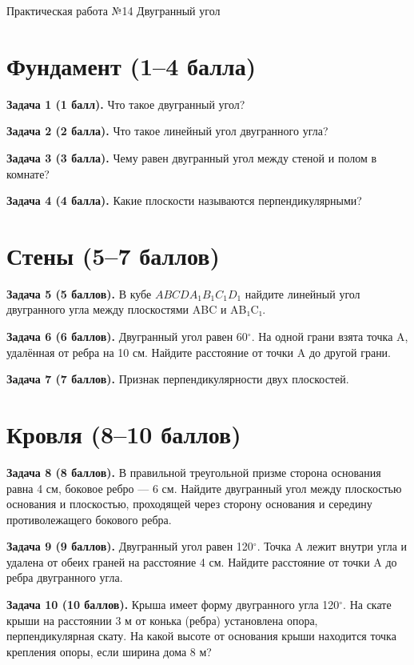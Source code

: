 \documentclass{umk-matematika}
\begin{document}
\maketitlepage
    {Практическая работа №14}
    {Двугранный угол}
    {}

\section{Фундамент (1--4 балла)}

\textbf{Задача 1 (1 балл).} Что такое двугранный угол?

\textbf{Задача 2 (2 балла).} Что такое линейный угол двугранного угла?

\textbf{Задача 3 (3 балла).} Чему равен двугранный угол между стеной и полом в комнате?

\textbf{Задача 4 (4 балла).} Какие плоскости называются перпендикулярными?

\section{Стены (5--7 баллов)}

\textbf{Задача 5 (5 баллов).} В кубе $ABCDA_1B_1C_1D_1$ найдите линейный угол двугранного угла между плоскостями ABC и AB₁C₁.

\textbf{Задача 6 (6 баллов).} Двугранный угол равен 60$^\circ$. На одной грани взята точка A, удалённая от ребра на 10 см. Найдите расстояние от точки A до другой грани.

\textbf{Задача 7 (7 баллов).} Признак перпендикулярности двух плоскостей.

\section{Кровля (8--10 баллов)}

\textbf{Задача 8 (8 баллов).} В правильной треугольной призме сторона основания равна 4 см, боковое ребро — 6 см. Найдите двугранный угол между плоскостью основания и плоскостью, проходящей через сторону основания и середину противолежащего бокового ребра.

\textbf{Задача 9 (9 баллов).} Двугранный угол равен 120$^\circ$. Точка A лежит внутри угла и удалена от обеих граней на расстояние 4 см. Найдите расстояние от точки A до ребра двугранного угла.

\textbf{Задача 10 (10 баллов).} Крыша имеет форму двугранного угла 120$^\circ$. На скате крыши на расстоянии 3 м от конька (ребра) установлена опора, перпендикулярная скату. На какой высоте от основания крыши находится точка крепления опоры, если ширина дома 8 м?

\newpage
\end{document}
